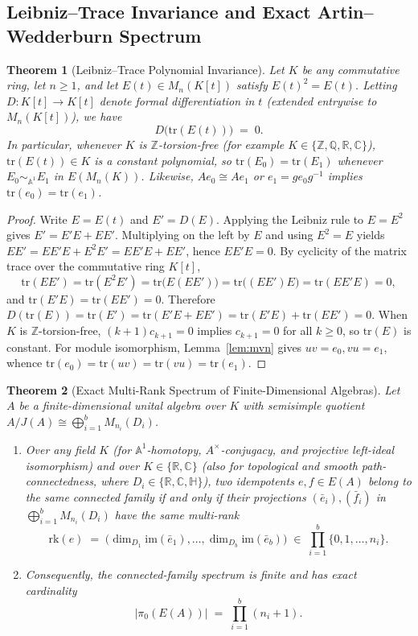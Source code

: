 \documentclass[11pt,a4paper]{article}
\newtheorem{theorem}{Theorem}[section]
\theoremstyle{definition}
\newcommand{\R}{\mathbb{R}}
\newcommand{\C}{\mathbb{C}}
\newcommand{\HH}{\mathbb{H}}
\newcommand{\Q}{\mathbb{Q}}
\newcommand{\Z}{\mathbb{Z}}
\newcommand{\tr}{\mathrm{tr}}
\newcommand{\rk}{\mathrm{rk}}
\begin{document}
\subsection{Leibniz--Trace Invariance and Exact Artin--Wedderburn Spectrum}

\begin{theorem}[Leibniz--Trace Polynomial Invariance]\label{thm:leibniz}
Let $K$ be any commutative ring, let $n\ge 1$, and let $E(t)\in M_n(K[t])$ satisfy
$E(t)^2 = E(t)$. Letting $D : K[t]\to K[t]$ denote formal differentiation in $t$ (extended
entrywise to $M_n(K[t])$), we have
\[
  D\bigl(\tr(E(t))\bigr) \;=\; 0.
\]
In particular, whenever $K$ is $\Z$-torsion-free (for example $K\in\{\Z,\Q,\R,\C\}$),
$\tr(E(t))\in K$ is a constant polynomial, so $\tr(E_0)=\tr(E_1)$ whenever
$E_0 \sim_{\mathbb{A}^1} E_1$ in $E(M_n(K))$. Likewise, $Ae_0 \cong Ae_1$ or
$e_1 = g e_0 g^{-1}$ implies $\tr(e_0)=\tr(e_1)$.
\end{theorem}

\begin{proof}
Write $E = E(t)$ and $E' = D(E)$. Applying the Leibniz rule to $E = E^2$ gives
$E' = E'E + EE'$. Multiplying on the left by $E$ and using $E^2=E$ yields
$EE' = EE'E + E^2 E' = EE'E + EE'$, hence $EE'E = 0$. By cyclicity of the matrix trace over
the commutative ring $K[t]$,
\[
  \tr(EE') = \tr(E^2 E') = \tr\bigl(E(EE')\bigr) = \tr\bigl((EE')E\bigr) = \tr(EE'E) = 0,
\]
and $\tr(E'E) = \tr(EE') = 0$. Therefore
$D(\tr(E)) = \tr(E') = \tr(E'E + EE') = \tr(E'E) + \tr(EE') = 0$. When $K$ is
$\Z$-torsion-free, $(k+1)c_{k+1}=0$ implies $c_{k+1}=0$ for all $k\ge 0$, so $\tr(E)$ is
constant. For module isomorphism, Lemma~\ref{lem:mvn} gives $uv=e_0, vu=e_1$, whence
$\tr(e_0)=\tr(uv)=\tr(vu)=\tr(e_1)$.
\end{proof}

\begin{theorem}[Exact Multi-Rank Spectrum of Finite-Dimensional Algebras]\label{thm:multirank}
Let $A$ be a finite-dimensional unital algebra over $K$ with semisimple quotient
$A/J(A)\cong\bigoplus_{i=1}^b M_{n_i}(D_i)$.
\begin{enumerate}
  \setlength{\itemsep}{2pt}
  \item Over any field $K$ (for $\mathbb{A}^1$-homotopy, $A^\times$-conjugacy, and projective
    left-ideal isomorphism) and over $K\in\{\R,\C\}$ (also for topological and smooth
    path-connectedness, where $D_i\in\{\R,\C,\HH\}$), two idempotents $e,f\in E(A)$ belong to
    the same connected family if and only if their projections $(\bar e_i),(\bar f_i)$ in
    $\bigoplus_{i=1}^b M_{n_i}(D_i)$ have the same multi-rank
    \[
      \rk(e) \;=\; \bigl(\dim_{D_1}\mathrm{im}(\bar e_1),\dots,\dim_{D_b}\mathrm{im}(\bar e_b)\bigr)
      \;\in\; \prod_{i=1}^{b}\{0,1,\dots,n_i\}.
    \]
  \item Consequently, the connected-family spectrum is finite and has exact cardinality
    \begin{equation}\label{eq:exact}
      \bigl|\pi_0(E(A))\bigr| \;=\; \prod_{i=1}^{b}(n_i + 1).
    \end{equation}
\end{enumerate}
\end{theorem}
\end{document}
